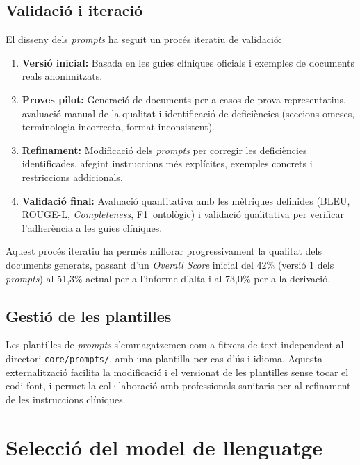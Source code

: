 \documentclass[CAT]{TFUOC}%
\begin{document}
\subsection{Validació i iteració}

El disseny dels \textit{prompts} ha seguit un procés iteratiu de validació:

\begin{enumerate}
    \item \textbf{Versió inicial:} Basada en les guies clíniques oficials i exemples de documents reals anonimitzats.

    \item \textbf{Proves pilot:} Generació de documents per a casos de prova representatius, avaluació manual de la qualitat i identificació de deficiències (seccions omeses, terminologia incorrecta, format inconsistent).

    \item \textbf{Refinament:} Modificació dels \textit{prompts} per corregir les deficiències identificades, afegint instruccions més explícites, exemples concrets i restriccions addicionals.

    \item \textbf{Validació final:} Avaluació quantitativa amb les mètriques definides (BLEU, ROUGE-L, \textit{Completeness}, F1~ontològic) i validació qualitativa per verificar l'adherència a les guies clíniques.
\end{enumerate}

Aquest procés iteratiu ha permès millorar progressivament la qualitat dels documents generats, passant d'un \textit{Overall Score} inicial del 42\% (versió 1 dels \textit{prompts}) al 51,3\% actual per a l'informe d'alta i al 73,0\% per a la derivació.

\subsection{Gestió de les plantilles}

Les plantilles de \textit{prompts} s'emmagatzemen com a fitxers de text independent al directori \texttt{core/prompts/}, amb una plantilla per cas d'ús i idioma. Aquesta externalització facilita la modificació i el versionat de les plantilles sense tocar el codi font, i permet la col·laboració amb professionals sanitaris per al refinament de les instruccions clíniques.

\section{Selecció del model de llenguatge}
\end{document}
